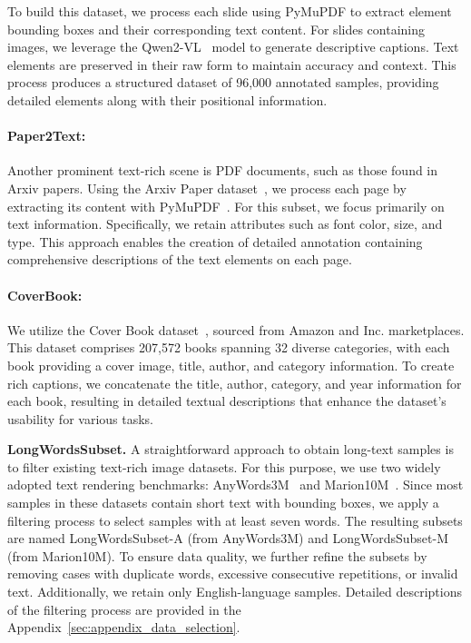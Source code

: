 To build this dataset, we process each slide using PyMuPDF to extract element bounding boxes and their corresponding text content. 
For slides containing images, we leverage the Qwen2-VL~\cite{qwen2_vl} model to generate descriptive captions. Text elements are preserved in their raw form to maintain accuracy and context.
This process produces a structured dataset of 96,000 annotated samples, providing detailed elements along with their positional information.


\paragraph{Paper2Text:}
Another prominent text-rich scene is PDF documents, such as those found in Arxiv papers. 
Using the Arxiv Paper dataset~\cite{arxiv_org_submitters_2024}, we process each page by extracting its content with PyMuPDF~\cite{pymupdf}.  
For this subset, we focus primarily on text information. 
Specifically, we retain attributes such as font color, size, and type. 
This approach enables the creation of detailed annotation containing comprehensive descriptions of the text elements on each page.

\paragraph{CoverBook:}
We utilize the Cover Book dataset~\cite{coverbook}, sourced from Amazon and Inc. marketplaces. 
This dataset comprises 207,572 books spanning 32 diverse categories, with each book providing a cover image, title, author, and category information.
To create rich captions, we concatenate the title, author, category, and year information for each book, resulting in detailed textual descriptions that enhance the dataset's usability for various tasks.

\textbf{LongWordsSubset.}
A straightforward approach to obtain long-text samples is to filter existing text-rich image datasets. For this purpose, we use two widely adopted text rendering benchmarks: AnyWords3M~\cite{anytext} and Marion10M~\cite{textdiffuser2}.
Since most samples in these datasets contain short text with bounding boxes, we apply a filtering process to select samples with at least seven words. The resulting subsets are named LongWordsSubset-A (from AnyWords3M) and LongWordsSubset-M (from Marion10M).
To ensure data quality, we further refine the subsets by removing cases with duplicate words, excessive consecutive repetitions, or invalid text. Additionally, we retain only English-language samples. 
Detailed descriptions of the filtering process are provided in the Appendix~\ref{sec:appendix_data_selection}.

